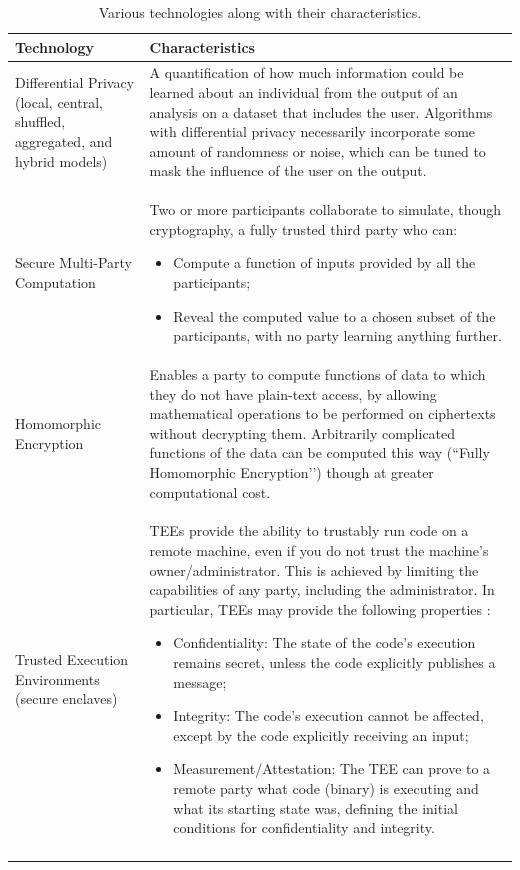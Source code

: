 \begin{table}
\renewcommand{\arraystretch}{1.2}
\begin{center} 
\begin{tabular}{@{}p{2in} p{4in}@{}}
 \toprule 
\textbf{Technology} & \textbf{Characteristics} \\
\midrule
\addlinespace[0.05in]
Differential Privacy (local, central, shuffled, aggregated, and hybrid models) & A quantification of how much information could be learned about an individual from the output of an analysis on a dataset that includes the user. Algorithms with differential privacy necessarily incorporate some amount of randomness or noise, which can be tuned to mask the influence of the user on the output. 
\\
\addlinespace[0.1in]
Secure Multi-Party Computation & Two or more participants collaborate to simulate, though cryptography, a fully trusted third party who can:
\begin{itemize} 
\item  Compute a function of inputs provided by all the participants;
\item Reveal the computed value to a chosen subset of the participants, with no party learning anything further.
\end{itemize}
\\
\addlinespace[0.1in]
Homomorphic Encryption & Enables a party to compute functions of data to which they do not have plain-text access, by allowing mathematical operations to be performed on ciphertexts without decrypting them.  Arbitrarily complicated functions of the data can be computed this way (``Fully Homomorphic Encryption’’) though at greater computational cost. 
\\
\addlinespace[0.1in]
Trusted Execution Environments (secure enclaves) & TEEs provide the ability to trustably run code on a remote machine, even if you do not trust the machine's owner/administrator.  This is achieved by limiting the capabilities of any party, including the administrator.  In particular, TEEs may provide the following properties \cite{subramanyan2017formal}:
\begin{itemize}
\item Confidentiality: The state of the code's execution remains secret, unless the code explicitly publishes a message;
\item Integrity: The code's execution cannot be affected, except by the code explicitly receiving an input;
\item Measurement/Attestation: The TEE can prove to a remote party what code (binary) is executing and what its starting state was, defining the initial conditions for confidentiality and integrity.
\end{itemize}
\\
\addlinespace[0.05in] 
\bottomrule
\end{tabular} 
\end{center}
\caption{Various technologies along with their characteristics.} 
\label{table:technologies}
\end{table}

